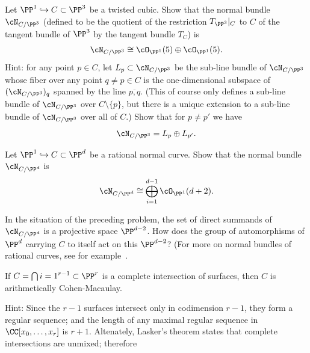 
\begin{exercise}\label{Normal bundle of cubic}
Let $\PP^1 \hookrightarrow C \subset \PP^3$ be a twisted cubic. Show that the normal bundle $\cN_{C/\PP^3}$ (defined to be the quotient of the restriction $T_{\PP^3}|_C$ to $C$ of the tangent bundle  of $\PP^3$  by the tangent bundle $T_C$) is 
$$
\cN_{C/\PP^3} \cong \cO_{\PP^1}(5) \oplus  \cO_{\PP^1}(5).
$$
Hint: for any point $p \in C$, let $L_p \subset \cN_{C/\PP^3}$ be the sub-line bundle of $\cN_{C/\PP^3}$ whose fiber over any point $q \neq p \in C$ is the one-dimensional subspace of $(\cN_{C/\PP^3})_q$ spanned by the line $\overline{p,q}$. (This of course only defines a sub-line bundle of $\cN_{C/\PP^3}$ over $C \setminus \{p\}$, but there is a unique extension to a sub-line bundle of $\cN_{C/\PP^3}$ over all of $C$.) Show that for $p \neq p'$ we have
$$
\cN_{C/\PP^3} = L_p \oplus L_{p'}.
$$
\end{exercise}

\begin{exercise}
Let $\PP^1 \hookrightarrow C \subset \PP^d$ be a rational normal curve. Show that the normal bundle $\cN_{C/\PP^d}$  is 
$$
\cN_{C/\PP^d} \cong \bigoplus_{i=1}^{d-1} \cO_{\PP^1}(d+2).
$$
\end{exercise}

\begin{exercise}
In the situation of the preceding problem, the set  of direct summands of $\cN_{C/\PP^d} $ is a projective space $\PP^{d-2}$. How does the  group of automorphisms of $\PP^d$ carrying $C$ to itself act on this $\PP^{d-2}$?
(For more on normal bundles of rational curves, see for example~\cite{MR3778979}.
\end{exercise}

\begin{exercise}\label{ci is acm}
If $C=\bigcap{i = 1}^{r-1} \subset \PP^r$ is a complete intersection of surfaces,
then $C$ is arithmetically Cohen-Macaulay.

Hint: Since the $r-1$ surfaces intersect only in codimension $r-1$, they form
a regular sequence; and the length of any maximal regular sequence in 
$\CC[x_0,\dots, x_r]$ is $r+1$. Altenately, Lasker's theorem states that complete intersections are unmixed; therefore
\end{exercise}





